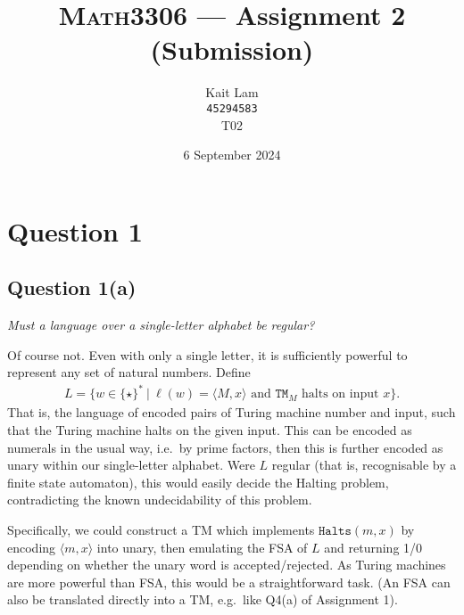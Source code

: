 \documentclass[a4paper]{article}
\author{Kait Lam \\ \small \texttt{45294583} \\ \small {T02}}
\title{\textsc{Math3306} --- Assignment 2 (Submission)}
\date{6 September 2024}
\begin{document}
\maketitle


\section*{Question 1}
\subsection*{Question 1(a)}
\begin{center}
  \textit{Must a language over a single-letter alphabet be regular?}
\end{center}
Of course not.
Even with only a single letter, it is sufficiently powerful to represent any set of natural numbers.
Define
\begin{align*}
  L = \{w \in \{\star\}^* ~|~ \ell(w) = \langle M, x \rangle \text{ and } \texttt{TM}_M\text{ halts on input }x\}.
\end{align*}
That is, the language of encoded pairs of Turing machine number and input, such that the Turing machine halts on the given
input.
This can be encoded as numerals in the usual way, i.e.\ by prime factors, then
this is further encoded as unary within our single-letter alphabet.
Were $L$ regular (that is, recognisable by a finite state automaton), this would easily decide the Halting problem,
contradicting the known undecidability of this problem.

Specifically, we could construct a TM which implements $\texttt{Halts}(m, x)$
by encoding $\langle m, x  \rangle$ into unary, then emulating the FSA of $L$ and returning 1/0 depending on whether the unary word is accepted/rejected.
As Turing machines are more powerful than FSA, this would be a straightforward task. 
(An FSA can also be translated directly into a TM,
e.g.\ like Q4(a) of Assignment 1).


\end{document}
